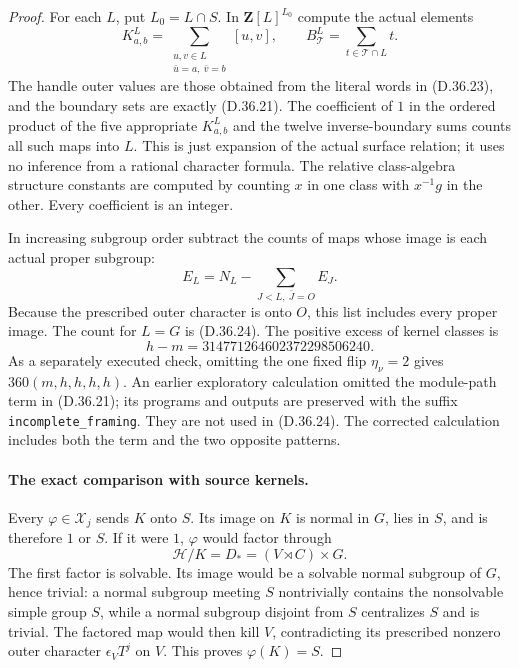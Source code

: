 \begin{proof}
For each \(L\), put \(L_0=L\cap S\).  In
\(\mathbf Z[L]^{L_0}\) compute the actual elements
\[
 K^L_{a,b}
   =\sum_{\substack{u,v\in L\\\bar u=a,\ \bar v=b}}[u,v],
 \qquad
 B^L_{\mathcal T}=\sum_{t\in\mathcal T\cap L}t.
 \tag{D.36.26}
\]
The handle outer values are those obtained from the literal
words in \textup{(D.36.23)}, and the boundary sets are exactly
\textup{(D.36.21)}.  The coefficient of \(1\) in the ordered
product of the five appropriate \(K^L_{a,b}\) and the twelve
inverse-boundary sums counts all such maps into \(L\).
This is just expansion of the actual surface relation; it
uses no inference from a rational character formula.
The relative class-algebra structure constants are computed
by counting \(x\) in one class with \(x^{-1}g\) in the other.
Every coefficient is an integer.

In increasing subgroup order subtract the counts of maps
whose image is each actual proper subgroup:
\[
 E_L=N_L-\sum_{J<L,\ \bar J=O}E_J.
 \tag{D.36.27}
\]
Because the prescribed outer character is onto \(O\), this
list includes every proper image.  The count for \(L=G\)
is \textup{(D.36.24)}.  The positive excess of kernel classes is
\[
                         h-m=314771264602372298506240.
 \tag{D.36.28}
\]
As a separately executed check, omitting the one fixed flip
\(\eta_\nu=2\) gives \(360(m,h,h,h,h)\).
An earlier exploratory calculation omitted the module-path
term in \textup{(D.36.21)}; its programs and outputs are
preserved with the suffix \texttt{incomplete\_framing}.
They are not used in \textup{(D.36.24)}.
The corrected calculation includes both the term and the
two opposite patterns.

\paragraph{The exact comparison with source kernels.}
Every \(\varphi\in\mathscr X_j\) sends \(K\) onto \(S\).
Its image on \(K\) is normal in \(G\), lies in \(S\), and
is therefore \(1\) or \(S\).  If it were \(1\), \(\varphi\)
would factor through
\[
                 \mathcal H/K=D_*=(V\rtimes C)\times G.
 \tag{D.36.29}
\]
The first factor is solvable.  Its image would be a solvable
normal subgroup of \(G\), hence trivial: a normal subgroup
meeting \(S\) nontrivially contains the nonsolvable simple
group \(S\), while a normal subgroup disjoint from \(S\)
centralizes \(S\) and is trivial.  The factored map would
then kill \(V\), contradicting its prescribed nonzero
outer character \(\epsilon_VT^j\) on \(V\).
This proves \(\varphi(K)=S\).


\end{proof}
